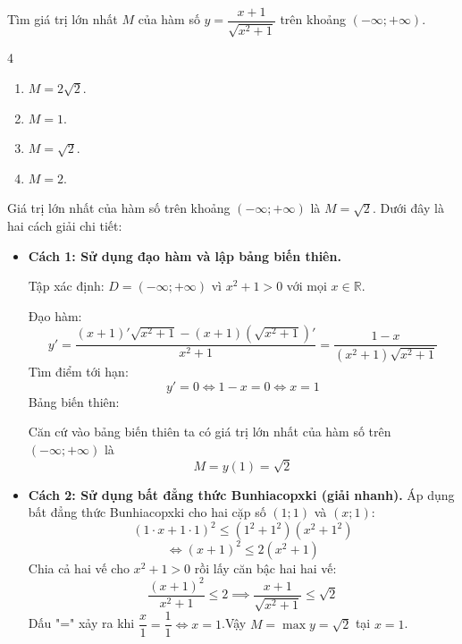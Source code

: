 \begin{baitap}
	Tìm giá trị lớn nhất $M$ của hàm số $y = \dfrac{x + 1}{\sqrt{x^2 + 1}}$ trên khoảng $(-\infty; +\infty)$.
	\begin{multicols}{4}
		\begin{enumerate}
			\item $M = 2\sqrt{2}$.
			\item $M = 1$.
			\item $M = \sqrt{2}$.
			\item $M = 2$.
		\end{enumerate}
	\end{multicols}
	\begin{traloi}
		Giá trị lớn nhất của hàm số trên khoảng $(-\infty; +\infty)$ là $M = \sqrt{2}$. Dưới đây là hai cách giải chi tiết:
		\begin{itemize}
			\item \textbf{Cách 1: Sử dụng đạo hàm và lập bảng biến thiên.}
			
			Tập xác định: $D = (-\infty; +\infty)$ vì $x^2 + 1 > 0$ với mọi $x \in \mathbb{R}$. 
			
			Đạo hàm: $$y' = \dfrac{(x + 1)'\sqrt{x^2 + 1} - (x + 1)\left(\sqrt{x^2 + 1}\right)'}{x^2 + 1}= \dfrac{1 - x}{(x^2 + 1)\sqrt{x^2 + 1}}$$
			Tìm điểm tới hạn:$$y' = 0 \iff 1 - x = 0 \iff x = 1$$
			Bảng biến thiên: 
			\begin{center}
			\end{center}
			Căn cứ vào bảng biến thiên ta có giá trị lớn nhất của hàm số trên $(-\infty; +\infty)$ là $$M = y(1) = \sqrt{2}$$
			\item \textbf{Cách 2: Sử dụng bất đẳng thức Bunhiacopxki (giải nhanh).} Áp dụng bất đẳng thức Bunhiacopxki cho hai cặp số $(1; 1)$ và $(x; 1)$:$$(1 \cdot x + 1 \cdot 1)^2 \le (1^2 + 1^2)(x^2 + 1^2)$$$$\iff (x + 1)^2 \le 2(x^2 + 1)$$Chia cả hai vế cho $x^2 + 1 > 0$ rồi lấy căn bậc hai hai vế:$$\dfrac{(x + 1)^2}{x^2 + 1} \le 2 \implies \dfrac{x + 1}{\sqrt{x^2 + 1}} \le \sqrt{2}$$Dấu "=" xảy ra khi $\dfrac{x}{1} = \dfrac{1}{1} \iff x = 1$.Vậy $M = \max y = \sqrt{2}$ tại $x = 1$.
		\end{itemize}
	\end{traloi}
\end{baitap}

